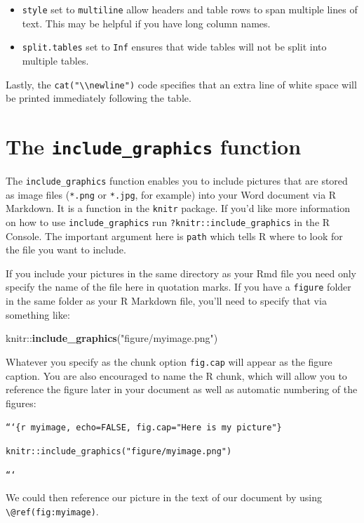 \documentclass[]{tufte-book}
\newenvironment{Shaded}{\begin{snugshade}}{\end{snugshade}}
\newcommand{\KeywordTok}[1]{\textcolor[rgb]{0.13,0.29,0.53}{\textbf{{#1}}}}
\newcommand{\StringTok}[1]{\textcolor[rgb]{0.31,0.60,0.02}{{#1}}}
\newcommand{\NormalTok}[1]{{#1}}
\begin{document}
\begin{itemize}
\item
  \texttt{style} set to \texttt{multiline} allow headers and table rows
  to span multiple lines of text. This may be helpful if you have long
  column names.
\item
  \texttt{split.tables} set to \texttt{Inf} ensures that wide tables
  will not be split into multiple tables.
\end{itemize}

Lastly, the \texttt{cat("\textbackslash{}\textbackslash{}newline")} code
specifies that an extra line of white space will be printed immediately
following the table.

\section{\texorpdfstring{The \texttt{include\_graphics}
function}{The include\_graphics function}}\label{the-include_graphics-function}

The \texttt{include\_graphics} function enables you to include pictures
that are stored as image files (\texttt{*.png} or \texttt{*.jpg}, for
example) into your Word document via R Markdown. It is a function in the
\texttt{knitr} package. If you'd like more information on how to use
\texttt{include\_graphics} run \texttt{?knitr::include\_graphics} in the
R Console. The important argument here is \texttt{path} which tells R
where to look for the file you want to include.

If you include your pictures in the same directory as your Rmd file you
need only specify the name of the file here in quotation marks. If you
have a \texttt{figure} folder in the same folder as your R Markdown
file, you'll need to specify that via something like:

\begin{Shaded}
\begin{Highlighting}[]
\NormalTok{knitr::}\KeywordTok{include_graphics}\NormalTok{(}\StringTok{"figure/myimage.png"}\NormalTok{)}
\end{Highlighting}
\end{Shaded}

Whatever you specify as the chunk option \texttt{fig.cap} will appear as
the figure caption. You are also encouraged to name the R chunk, which
will allow you to reference the figure later in your document as well as
automatic numbering of the figures:

\texttt{```\{r\ myimage,\ echo=FALSE,\ fig.cap="Here\ is\ my\ picture"\}}

\texttt{knitr::include\_graphics("figure/myimage.png")}

\texttt{```}

We could then reference our picture in the text of our document by using
\texttt{\textbackslash{}@ref(fig:myimage)}.

\renewcommand{\bibname}{References}

% 
% 
\end{document}
